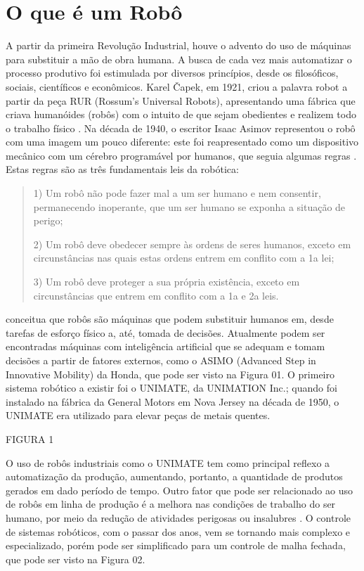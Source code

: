 \section{O que é um Robô}\label{sec:oque_robo}
A partir da primeira Revolução Industrial, houve o advento do uso de máquinas para substituir a mão de obra humana. A busca de cada vez mais automatizar o processo produtivo foi estimulada por diversos princípios, desde os filosóficos, sociais, científicos e  econômicos. Karel Čapek, em 1921, criou a palavra robot a partir da peça RUR (Rossum's Universal Robots), apresentando uma fábrica que criava humanóides (robôs) com o intuito de que sejam obedientes e realizem todo o trabalho físico \cite{wellek}. Na década de 1940, o escritor Isaac Asimov representou o robô com uma imagem um pouco diferente: este foi reapresentado como um dispositivo mecânico com um cérebro programável por humanos, que seguia algumas regras \cite{asimov}. Estas regras são as três fundamentais leis da robótica:

\begin{quote}
1) Um robô não pode fazer mal a um ser humano e nem consentir, permanecendo inoperante, que um ser humano se exponha a situação de perigo;

2) Um robô deve obedecer sempre às ordens de seres humanos, exceto em circunstâncias nas quais estas ordens entrem em conflito com a 1a lei; 

3) Um robô deve proteger a sua própria existência, exceto em circunstâncias que entrem em conflito com a 1a e 2a leis. 
\end{quote}	

\cite{siciliano2010} conceitua que robôs são máquinas que podem substituir humanos em, desde tarefas de esforço físico a, até, tomada de decisões. Atualmente podem ser encontradas máquinas com inteligência artificial que se adequam e tomam decisões a partir de fatores externos, como o ASIMO (Advanced Step in Innovative Mobility) da Honda, que pode ser visto na Figura 01. O primeiro sistema robótico a existir foi o UNIMATE, da UNIMATION Inc.; quando foi instalado na fábrica da General Motors em Nova Jersey na década de 1950, o UNIMATE era utilizado para elevar peças de metais quentes.

FIGURA 1

O uso de robôs industriais como o UNIMATE tem como principal reflexo a automatização da produção, aumentando, portanto, a quantidade de produtos gerados em dado período de tempo. Outro fator que pode ser relacionado ao uso de robôs em linha de produção é a melhora nas condições de trabalho do ser humano, por meio da redução de atividades perigosas ou insalubres \cite{bouteille}.
O controle de sistemas robóticos, com o passar dos anos, vem se tornando mais complexo e especializado, porém pode ser simplificado para um controle de malha fechada, que pode ser visto na Figura 02.

